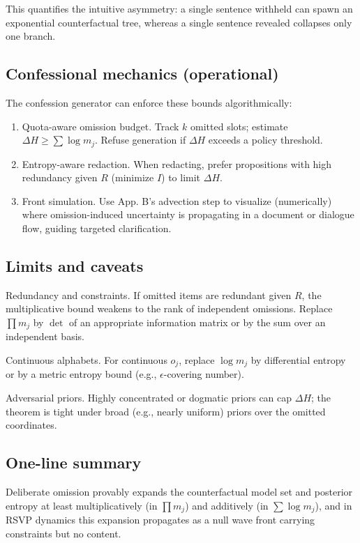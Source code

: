 \documentclass[12pt,a4paper]{article}
\begin{document}
This quantifies the intuitive asymmetry: a single sentence withheld can spawn an exponential counterfactual tree, whereas a single sentence revealed collapses only one branch.

\subsection{Confessional mechanics (operational)}

The confession generator can enforce these bounds algorithmically:

\begin{enumerate}
\item Quota-aware omission budget. Track $k$ omitted slots; estimate $\Delta H \geq \sum \log m_j$. Refuse generation if $\Delta H$ exceeds a policy threshold.
\item Entropy-aware redaction. When redacting, prefer propositions with high redundancy given $R$ (minimize $I$) to limit $\Delta H$.
\item Front simulation. Use App. B’s advection step to visualize (numerically) where omission-induced uncertainty is propagating in a document or dialogue flow, guiding targeted clarification.
\end{enumerate}

\subsection{Limits and caveats}

Redundancy and constraints. If omitted items are redundant given $R$, the multiplicative bound weakens to the rank of independent omissions. Replace $\prod m_j$ by $\det$ of an appropriate information matrix or by the sum over an independent basis.

Continuous alphabets. For continuous $o_j$, replace $\log m_j$ by differential entropy or by a metric entropy bound (e.g., $\epsilon$-covering number).

Adversarial priors. Highly concentrated or dogmatic priors can cap $\Delta H$; the theorem is tight under broad (e.g., nearly uniform) priors over the omitted coordinates.

\subsection{One-line summary}

Deliberate omission provably expands the counterfactual model set and posterior entropy at least multiplicatively (in $\prod m_j$) and additively (in $\sum \log m_j$), and in RSVP dynamics this expansion propagates as a null wave front carrying constraints but no content.
\end{document}
